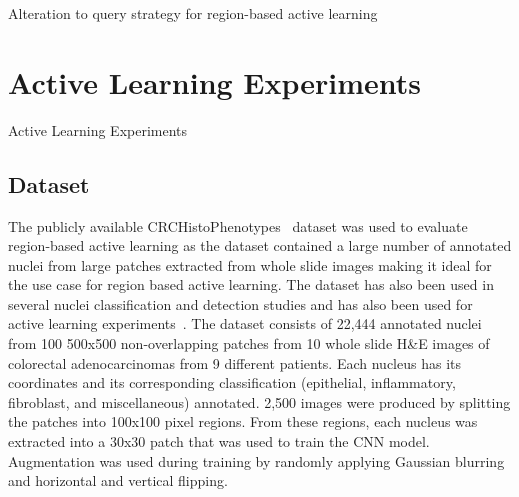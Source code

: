 \begin{algorithm}[h]
	
	\caption{Alteration to query strategy for region-based active learning}
	\label{alg:regionbased}
\end{algorithm}



\section{Active Learning Experiments}
Active Learning Experiments

\subsection{Dataset}
The publicly available CRCHistoPhenotypes~\citep{sirinukunwattana2016locality} dataset was used to evaluate region-based active learning as the dataset contained a large number of annotated nuclei from large patches extracted from whole slide images making it ideal for the use case for region based active learning. The dataset has also been used in several nuclei classification and detection studies and has also been used for active learning experiments~\citep{shao2018deep}. The dataset consists of 22,444 annotated nuclei from 100 500x500 non-overlapping patches from 10 whole slide H\&E images of colorectal adenocarcinomas from 9 different patients. Each nucleus has its coordinates and its corresponding classification (epithelial, inflammatory, fibroblast, and miscellaneous) annotated. 2,500 images were produced by splitting the patches into 100x100 pixel regions. From these regions, each nucleus was extracted into a 30x30 patch that was used to train the CNN model. Augmentation was used during training by randomly applying Gaussian blurring and horizontal and vertical flipping.

